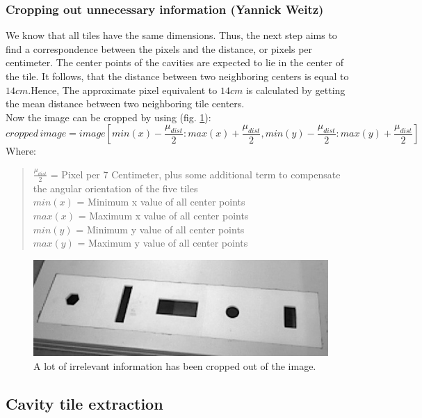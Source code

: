 \documentclass{article}
\begin{document}
\subsubsection*{Cropping out unnecessary information (Yannick Weitz)}
We know that all tiles have the same dimensions. Thus, the next step aims to find a correspondence between the pixels and the distance, or pixels per centimeter. The center points of the cavities are expected to lie in the center of the tile. It follows, that the distance between two neighboring centers is equal to $14cm$.Hence, The approximate pixel equivalent to $14cm$ is calculated by getting the mean distance between two neighboring tile centers.\\
Now the image can be cropped by using (fig. \ref{fig:cropped}):
\begin{equation}
cropped \, image = image[min(x)-\frac{\mu_{dist}}{2}:max(x)+\frac{\mu_{dist}}{2},min(y)-\frac{\mu_{dist}}{2}:max(y)+\frac{\mu_{dist}}{2}]
\end{equation}
Where:
\begin{quote}
$\frac{\mu_{dist}}{2}$ = Pixel per 7 Centimeter, plus some additional term to compensate the angular orientation of the five tiles\\
$min(x)$ = Minimum x value of all center points\\
$max(x)$ = Maximum x value of all center points\\
$min(y)$ = Minimum y value of all center points\\
$max(y)$ = Maximum y value of all center points\\
\end{quote}
\begin{figure}[h!]
\centering
\includegraphics[scale=0.3]{images/cropped.jpg}
\caption{A lot of irrelevant information has been cropped out of the image.}
\label{fig:cropped}
\end{figure}

\subsection{Cavity tile extraction}
\end{document}
